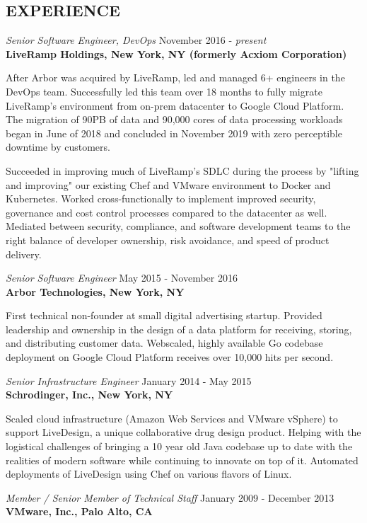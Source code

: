\documentclass[overlapped,line,margin]{res}
\begin{document}
\begin{resume}
\section{EXPERIENCE}
\textit{Senior Software Engineer, DevOps} \hfill November 2016 - \textit{present} \\
\textbf{LiveRamp Holdings, New York, NY (formerly Acxiom Corporation)}

  After Arbor was acquired by LiveRamp, led and managed 6+ engineers in
  the DevOps team. Successfully led this team over 18 months to fully
  migrate LiveRamp's environment from on-prem datacenter to Google Cloud
  Platform. The migration of 90PB of data and 90,000 cores of data
  processing workloads began in June of 2018 and concluded in November
  2019 with zero perceptible downtime by customers.

  Succeeded in improving much of LiveRamp's SDLC during the process by
  "lifting and improving" our existing Chef and VMware environment to
  Docker and Kubernetes. Worked cross-functionally to implement improved
  security, governance and cost control processes compared to the
  datacenter as well. Mediated between security, compliance, and
  software development teams to the right balance of developer
  ownership, risk avoidance, and speed of product delivery.

\textit{Senior Software Engineer} \hfill May 2015 - November 2016 \\
\textbf{Arbor Technologies, New York, NY}

  First technical non-founder at small digital advertising startup.
  Provided leadership and ownership in the design of a data platform for
  receiving, storing, and distributing customer data. Webscaled, highly
  available Go codebase deployment on Google Cloud Platform receives
  over 10,000 hits per second.

\textit{Senior Infrastructure Engineer} \hfill January 2014 - May 2015 \\
\textbf{Schrodinger, Inc., New York, NY}

  Scaled cloud infrastructure (Amazon Web Services and VMware vSphere) to
  support LiveDesign, a unique collaborative drug design product. Helping with
  the logistical challenges of bringing a 10 year old Java codebase up to date
  with the realities of modern software while continuing to innovate on top of
  it. Automated deployments of LiveDesign using Chef on various flavors of
  Linux.

\textit{Member / Senior Member of Technical Staff} \hfill January 2009 - December 2013 \\
\textbf{VMware, Inc., Palo Alto, CA}


\end{resume}
\end{document}
